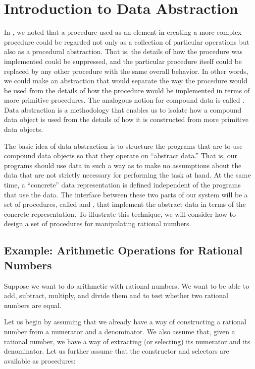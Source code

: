 \section{Introduction to Data Abstraction}
\label{Section 2.1}

In , we noted that a procedure used as an element in
creating a more complex procedure could be regarded not only as a collection of
particular operations but also as a procedural abstraction.  That is, the
details of how the procedure was implemented could be suppressed, and the
particular procedure itself could be replaced by any other procedure with the
same overall behavior.  In other words, we could make an abstraction that would
separate the way the procedure would be used from the details of how the
procedure would be implemented in terms of more primitive procedures.  The
analogous notion for compound data is called .  Data
abstraction is a methodology that enables us to isolate how a compound data
object is used from the details of how it is constructed from more primitive
data objects.

The basic idea of data abstraction is to structure the programs that are to use
compound data objects so that they operate on ``abstract data.'' That is, our
programs should use data in such a way as to make no assumptions about the data
that are not strictly necessary for performing the task at hand.  At the same
time, a ``concrete'' data representation is defined independent of the programs
that use the data.  The interface between these two parts of our system will be
a set of procedures, called  and ,
that implement the abstract data in terms of the concrete representation.  To
illustrate this technique, we will consider how to design a set of procedures
for manipulating rational numbers.



\subsection{Example: Arithmetic Operations for Rational Numbers}
\label{Section 2.1.1}

Suppose we want to do arithmetic with rational numbers.  We want to be able to
add, subtract, multiply, and divide them and to test whether two rational
numbers are equal.

Let us begin by assuming that we already have a way of constructing a rational
number from a numerator and a denominator.  We also assume that, given a
rational number, we have a way of extracting (or selecting) its numerator and
its denominator.  Let us further assume that the constructor and selectors are
available as procedures:

